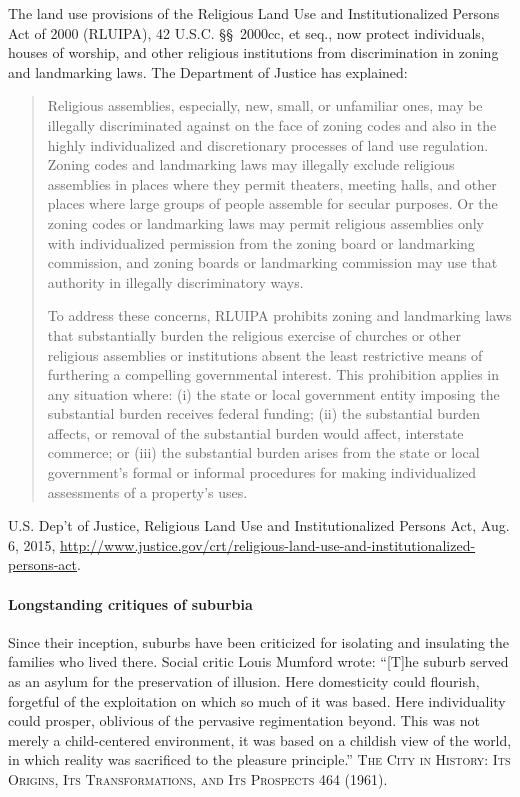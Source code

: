The land use provisions of the Religious Land Use and Institutionalized Persons
Act of 2000 (RLUIPA), 42 U.S.C. \S\S~2000cc, et seq., now protect individuals,
houses of worship, and other religious institutions from discrimination in
zoning and landmarking laws. The Department of Justice has explained:
\begin{quotation}
Religious assemblies, especially, new, small, or unfamiliar ones, may be
illegally discriminated against on the face of zoning codes and also in the
highly individualized and discretionary processes of land use regulation. Zoning
codes and landmarking laws may illegally exclude religious assemblies in places
where they permit theaters, meeting halls, and other places where large groups
of people assemble for secular purposes. Or the zoning codes or landmarking laws
may permit religious assemblies only with individualized permission from the
zoning board or landmarking commission, and zoning boards or landmarking
commission may use that authority in illegally discriminatory ways.

To address these concerns, RLUIPA prohibits zoning and landmarking laws that
substantially burden the religious exercise of churches or other religious
assemblies or institutions absent the least restrictive means of furthering a
compelling governmental interest. This prohibition applies in any situation
where: (i) the state or local government entity imposing the substantial burden
receives federal funding; (ii) the substantial burden affects, or removal of the
substantial burden would affect, interstate commerce; or (iii) the substantial
burden arises from the state or local government's formal or informal procedures
for making individualized assessments of a property's uses. 
\end{quotation}
U.S. Dep't of Justice, Religious Land Use and Institutionalized Persons Act,
Aug. 6, 2015,
\url{http://www.justice.gov/crt/religious-land-use-and-institutionalized-persons-act}.

\paragraph{Longstanding critiques of suburbia} Since their inception, suburbs
have been criticized for isolating and insulating the families who lived there.
Social critic Louis Mumford wrote: ``[T]he suburb served as an asylum for the
preservation of illusion. Here domesticity could flourish, forgetful of the
exploitation on which so much of it was based. Here individuality could prosper,
oblivious of the pervasive regimentation beyond. This was not merely a
child-centered environment, it was based on a childish view of the world, in
which reality was sacrificed to the pleasure principle.'' \textsc{The City in
History: Its Origins, Its Transformations, and Its Prospects} 464 (1961).


